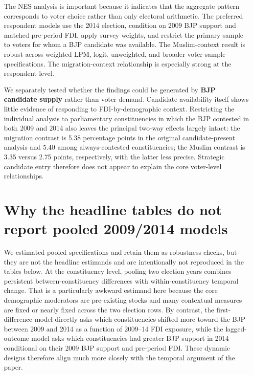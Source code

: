 \documentclass[11pt]{article}
\begin{document}
The NES analysis is important because it indicates that the aggregate pattern corresponds to voter choice rather than only electoral arithmetic. The preferred respondent models use the 2014 election, condition on 2009 BJP support and matched pre-period FDI, apply survey weights, and restrict the primary sample to voters for whom a BJP candidate was available. The Muslim-context result is robust across weighted LPM, logit, unweighted, and broader voter-sample specifications. The migration-context relationship is especially strong at the respondent level.

We separately tested whether the findings could be generated by \textbf{BJP candidate supply} rather than voter demand. Candidate availability itself shows little evidence of responding to FDI-by-demographic context. Restricting the individual analysis to parliamentary constituencies in which the BJP contested in both 2009 and 2014 also leaves the principal two-way effects largely intact: the migration contrast is 5.38 percentage points in the original candidate-present analysis and 5.40 among always-contested constituencies; the Muslim contrast is 3.35 versus 2.75 points, respectively, with the latter less precise. Strategic candidate entry therefore does not appear to explain the core voter-level relationships.

\section*{Why the headline tables do not report pooled 2009/2014 models}

We estimated pooled specifications and retain them as robustness checks, but they are not the headline estimands and are intentionally not reproduced in the tables below. At the constituency level, pooling two election years combines persistent between-constituency differences with within-constituency temporal change. That is a particularly awkward estimand here because the core demographic moderators are pre-existing stocks and many contextual measures are fixed or nearly fixed across the two election rows. By contrast, the first-difference model directly asks which constituencies shifted more toward the BJP between 2009 and 2014 as a function of 2009--14 FDI exposure, while the lagged-outcome model asks which constituencies had greater BJP support in 2014 conditional on their 2009 BJP support and pre-period FDI. These dynamic designs therefore align much more closely with the temporal argument of the paper.
\end{document}
